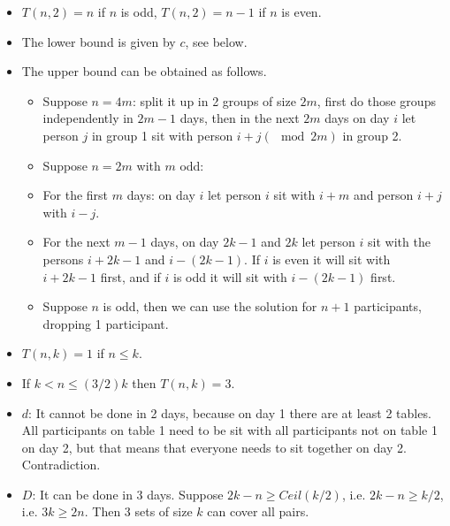 \documentclass[a4paper]{article}
\begin{document}
\begin{itemize}
\item
  $T(n,2)=n$ if $n$ is odd, $T(n,2)=n-1$ if
  $n$ is even.
\item
  The lower bound is given by $c$, see below.
\item
  The upper bound can be obtained as follows.

  \begin{itemize}
  \item
    Suppose $n=4m$: split it up in 2 groups of size
    $2m$, first do those groups independently in $2m-1$
    days, then in the next $2m$ days on day $i$ let person
    $j$ in group 1 sit with person $i+j(\mod2m)$ in
    group 2.
  \item
    Suppose $n=2m$ with $m$ odd:
  \item
    For the first $m$ days: on day $i$ let person
    $i$ sit with $i+m$ and person $i+j$ with
    $i-j$.
  \item
    For the next $m-1$ days, on day $2k-1$ and $2k$
    let person $i$ sit with the persons $i+2k-1$ and
    $i-(2k-1)$. If $i$ is even it will sit with
    $i+2k-1$ first, and if $i$ is odd it will sit with
    $i-(2k-1)$ first.
  \item
    Suppose $n$ is odd, then we can use the solution for
    $n+1$ participants, dropping 1 participant.
  \end{itemize}
\item
  $T(n,k)=1$ if $n\leq k$.
\item
  If $k<n\leq (3/2)k$ then $T(n,k)=3$.
\item
  $d$: It cannot be done in 2 days, because on day 1 there are at
  least 2 tables. All participants on table 1 need to be sit with all
  participants not on table 1 on day 2, but that means that everyone
  needs to sit together on day 2. Contradiction.
\item
  $D$: It can be done in 3 days. Suppose
  $2k-n\geq Ceil(k/2)$, i.e. $2k-n\geq k/2$, i.e.
  $3k\geq 2n$. Then 3 sets of size $k$ can cover all
  pairs.


\end{itemize}
\end{document}
